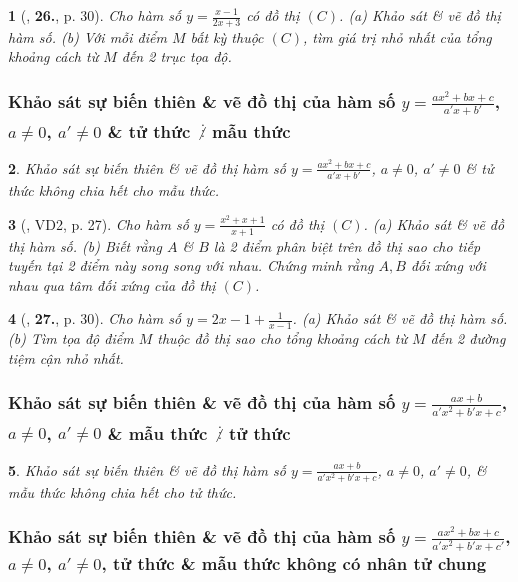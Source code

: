 \documentclass{article}
\newtheorem{baitoan}{}
\begin{document}
\begin{baitoan}[\cite{TLCT_giai_tich_12}, \textbf{26.}, p. 30]
	Cho hàm số $y = \frac{x - 1}{2x + 3}$ có đồ thị $(C)$. (a) Khảo sát \& vẽ đồ thị hàm số. (b) Với mỗi điểm $M$ bất kỳ thuộc $(C)$, tìm giá trị nhỏ nhất của tổng khoảng cách từ $M$ đến 2 trục tọa độ.	
\end{baitoan}

\subsubsection{Khảo sát sự biến thiên \& vẽ đồ thị của hàm số $y = \frac{ax^2 + bx + c}{a'x + b'}$, $a\ne 0$, $a'\ne 0$ \& tử thức $\not\vdots$ mẫu thức}

\begin{baitoan}
	Khảo sát sự biến thiên \& vẽ đồ thị hàm số $y = \frac{ax^2 + bx + c}{a'x + b'}$, $a\ne 0$, $a'\ne 0$ \& tử thức không chia hết cho mẫu thức.
\end{baitoan}

\begin{baitoan}[\cite{TLCT_giai_tich_12}, VD2, p. 27]
	Cho hàm số $y = \frac{x^2 + x + 1}{x + 1}$ có đồ thị $(C)$. (a) Khảo sát \& vẽ đồ thị hàm số. (b) Biết rằng $A$ \& $B$ là 2 điểm phân biệt trên đồ thị sao cho tiếp tuyến tại 2 điểm này song song với nhau. Chứng minh rằng $A,B$ đối xứng với nhau qua tâm đối xứng của đồ thị $(C)$.	
\end{baitoan}

\begin{baitoan}[\cite{TLCT_giai_tich_12}, \textbf{27.}, p. 30]
	Cho hàm số $y = 2x - 1 + \frac{1}{x - 1}$. (a) Khảo sát \& vẽ đồ thị hàm số. (b) Tìm tọa độ điểm $M$ thuộc đồ thị sao cho tổng khoảng cách từ $M$ đến 2 đường tiệm cận nhỏ nhất.	
\end{baitoan}

\subsubsection{Khảo sát sự biến thiên \& vẽ đồ thị của hàm số $y = \frac{ax + b}{a'x^2 + b'x + c}$, $a\ne 0$, $a'\ne 0$ \& mẫu thức $\not\vdots$ tử thức}

\begin{baitoan}
	Khảo sát sự biến thiên \& vẽ đồ thị hàm số $y = \frac{ax + b}{a'x^2 + b'x + c}$, $a\ne 0$, $a'\ne 0$, \& mẫu thức không chia hết cho tử thức.
\end{baitoan}

\subsubsection{Khảo sát sự biến thiên \& vẽ đồ thị của hàm số $y = \frac{ax^2 + bx + c}{a'x^2 + b'x + c'}$, $a\ne 0$, $a'\ne 0$, tử thức \& mẫu thức không có nhân tử chung}
\end{document}
